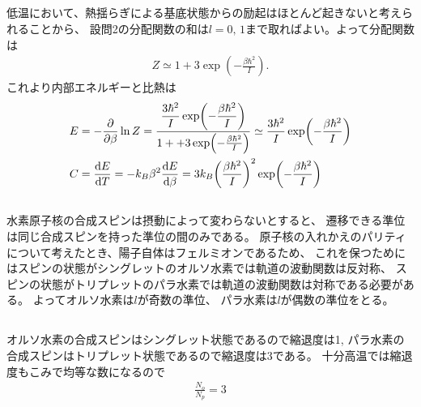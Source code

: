 \documentclass[../../master.tex]{subfiles}
\begin{document}
\subsection{}
低温において、熱揺らぎによる基底状態からの励起はほとんど起きないと考えられることから、
設問2の分配関数の和は\(l=0,\,1\)まで取ればよい。よって分配関数は
\begin{align}
    Z \simeq 1 + 3\exp(-\frac{\beta\hbar^2}{I}).
\end{align}
これより内部エネルギーと比熱は
\begin{align}
    E &= -\pdv{\beta} \ln Z
    = \dfrac{\dfrac{3\hbar^2}{I}\exp(-\dfrac{\beta\hbar^2}{I})}{1++ 3\exp(-\frac{\beta\hbar^2}{I})}
        \simeq \frac{3\hbar^2}{I}\exp(-\frac{\beta\hbar^2}{I})\\
    C &= \dv{E}{T} = -k_B\beta^2\dv{E}{\beta}
    = 3k_B\qty(\frac{\beta\hbar^2}{I})^2\exp(-\frac{\beta\hbar^2}{I})
\end{align}

\subsection{}
水素原子核の合成スピンは摂動によって変わらないとすると、
遷移できる準位は同じ合成スピンを持った準位の間のみである。
原子核の入れかえのパリティについて考えたとき、陽子自体はフェルミオンであるため、
これを保つためにはスピンの状態がシングレットのオルソ水素では軌道の波動関数は反対称、
スピンの状態がトリプレットのパラ水素では軌道の波動関数は対称である必要がある。
よってオルソ水素は\(l\)が奇数の準位、
パラ水素は\(l\)が偶数の準位をとる。

\subsection{}
オルソ水素の合成スピンはシングレット状態であるので縮退度は1,
パラ水素の合成スピンはトリプレット状態であるので縮退度は3である。
十分高温では縮退度もこみで均等な数になるので
\begin{align}
    \frac{N_o}{N_p} = 3
\end{align}
\end{document}

